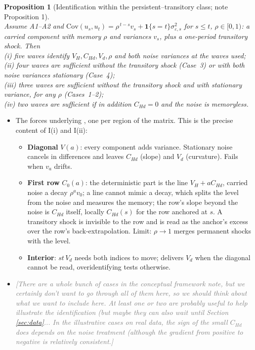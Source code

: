 \documentclass[11pt]{article}
\newtheorem{proposition}{Proposition}
\newcommand{\Cov}{\mathrm{Cov}}
\newcommand{\note}[1]{\textcolor{gray}{\textit{[#1]}}}
\begin{document}
	\begin{proposition}[Identification within the persistent--transitory class; note Proposition 1]\label{prop:main} ~\\
		Assume A1--A2 and $\Cov(u_s,u_t)=\rho^{\,t-s}v_s+\mathbf 1\{s=t\}\sigma^2_{\varepsilon,s}$ for $s\le t$, $\rho\in[0,1)$: a carried component with memory $\rho$ and variances $v_s$, plus a one-period transitory shock. Then  \\
		(i) five waves identify $V_H,C_{Hd},V_d,\rho$ and both noise variances at the waves used; \\
		(ii) four waves are sufficient without the transitory shock (Case~3) or with both noise variances stationary (Case~4); \\
		(iii) three waves are sufficient without the transitory shock and with stationary variance, for any $\rho$ (Cases~1--2); \\
		(iv) two waves are sufficient if in addition $C_{Hd}=0$ and the noise is memoryless.
	\end{proposition}
	
	\begin{itemize}
		\item The forces underlying , one per region of the matrix. This is the precise content of I(i) and I(ii):
		\begin{itemize}
			\item[I(i)] \textbf{Diagonal} $V(a)$: every component adds variance. Stationary noise cancels in differences and leaves $C_{Hd}$ (slope) and $V_d$ (curvature). Fails when $v_a$ drifts.
			\item[I(ii)] \textbf{First row} $C_0(a)$: the deterministic part is the line $V_H+aC_{Hd}$, carried noise a decay $\rho^av_0$; a line cannot mimic a decay, which splits the level from the noise and measures the memory; the row's slope beyond the noise is $C_{Hd}$ itself, locally $C_{Hd}(s)$ for the row anchored at $s$. A transitory shock is invisible to the row and is read as the anchor's excess over the row's back-extrapolation. Limit: $\rho\to1$ merges permanent shocks with the level.
			\item[I(iii)] \textbf{Interior}: $st\,V_d$ needs both indices to move; delivers $V_d$ when the diagonal cannot be read, overidentifying tests otherwise.
		\end{itemize}
		\item \note{There are a whole bunch of cases in the conceptual framework note, but we certainly don't want to go through all of them here, so we should think about what we want to include here. At least one or two are probably useful to help illustrate the identification (but maybe they can also wait until Section \ref{sec:data}... In the illustrative cases on real data, the sign of the small $C_{Hd}$ does depends on the noise treatment (although the gradient from positive to negative is relatively consistent.}
	\end{itemize}
	
\end{document}
